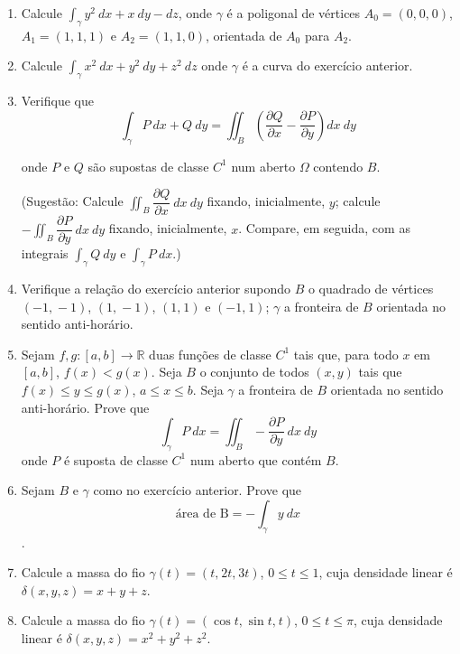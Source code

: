 \documentclass[11pt,a4paper]{article}
\begin{document}
\begin{enumerate}
\item Calcule $\displaystyle\int_\gamma y^2 \ dx + x \ dy - dz$, onde $\gamma$ é a poligonal de vértices $A_0 = (0 \textrm{,}\ 0 \textrm{,}\ 0)$, $A_1 = (1 \textrm{,}\ 1 \textrm{,}\ 1)$ e $A_2 = (1 \textrm{,}\ 1 \textrm{,}\ 0)$, orientada de $A_0$ para $A_2$. 

\item Calcule $\displaystyle\int_\gamma x^2 \ dx + y^2 \ dy + z^2 \ dz$ onde $\gamma$ é a curva do exercício anterior.

\item Verifique que 
$$\displaystyle\int_\gamma P \ dx + Q \ dy = \displaystyle\iint_B \left(\dfrac{\partial Q}{\partial x} - \dfrac{\partial P}{\partial y}\right) dx \ dy $$

onde $P$ e $Q$ são supostas de classe $C^1$ num aberto $\Omega$ contendo $B$.

(Sugestão: Calcule $\displaystyle\iint_B \dfrac{\partial Q}{\partial x} \ dx \ dy$  fixando, inicialmente, $y$; calcule $- \displaystyle\iint_B \dfrac{\partial P}{\partial y} \ dx \ dy$ fixando, inicialmente, $x$. Compare, em seguida, com as integrais $\displaystyle\int_\gamma Q \ dy$ e $\displaystyle\int_\gamma P \ dx$.)

\item Verifique a relação do exercício anterior supondo $B$ o quadrado de vértices $(-1 \textrm{,}\ -1)$, $(1 \textrm{,}\ -1)$, $(1 \textrm{,}\ 1)$ e $(-1 \textrm{,}\ 1)$; $\gamma$ a fronteira de $B$ orientada no sentido anti-horário.

\item Sejam $f, g:[a,b] \to \mathbb{R}$ duas funções de classe $C^1$ tais que, para todo $x$ em $[a,b]$, $f(x) < g(x)$. Seja $B$ o conjunto de todos $(x,y)$ tais que $f(x) \leq y \leq g(x)$, $a \leq x \leq b$. Seja $\gamma$ a fronteira de $B$ orientada no sentido anti-horário. Prove que
$$\displaystyle\int_\gamma P \ dx = \displaystyle\iint_B - \dfrac{\partial P}{\partial y} \ dx \ dy$$
onde $P$ é suposta de classe $C^1$ num aberto que contém $B$.

\item Sejam $B$ e $\gamma$ como no exercício anterior. Prove que
$$\textrm{área de B} = - \displaystyle\int_\gamma y \ dx $$.

\item Calcule a massa do fio $\gamma (t) = (t \textrm{,}\ 2t \textrm{,}\ 3t)$, $0 \leq t \leq 1$, cuja densidade linear é $\delta (x,y,z) = x + y + z$.

\item Calcule a massa do fio $\gamma (t) = (\cos t \textrm{,}\ \sin t \textrm{,}\ t)$, $0 \leq t \leq \pi$, cuja densidade linear é $\delta (x,y,z) = x^2 + y^2 + z^2$.


\end{enumerate}
\end{document}
